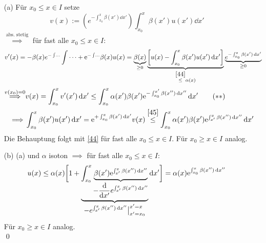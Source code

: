 \documentclass[a4paper]{article}
\begin{document}
\begin{Beweis}
\begin{itemize}
\item[(a)]Für $x_0\le x\in I$ setze
\[v(x):=\left(e^{-\int_{x_0}^x\beta(x')\dd x'}\right)\int_{x_0}^x\beta(x')u(x')\dd x'\]
$\overset{\text{abs. stetig}}{\implies}$ für fast alle $x_0\le x\in I$:
\[v'(x)=-\beta(x)e^{-\int\dots}\int\dots+\mathrm{e}^{-\int \dots}\beta(x)u(x)
=\underbrace{\beta(x)}_{\ge 0}\underbrace{\left[u(x)-\int_{x_0}^x\beta(x')u(x')\mathop{}\!\mathrm{d} x'\right]}_{\overset{\eqref{44}}{\le} \alpha(x)}\underbrace{e^{-\int_{x_0}^x\beta(x')\mathop{}\!\mathrm{d} x'}}_{\ge 0}\]
\begin{align*}
\overset{v(x_0)=0}\implies & v(x)=\int_{x_0}^x v'(x')\mathop{}\!\mathrm{d} x'\le\int_{x_0}^x\alpha(x')\beta(x')\mathrm{e}^{-\int_{x_0}^{x'}\beta(x'')\mathop{}\!\mathrm{d} x''}\mathop{}\!\mathrm{d} x' \tag{$**$} \label{45} \\
\implies& \int_{x_0}^x\beta(x')u(x')\mathop{}\!\mathrm{d} x'=\mathrm{e}^{+\int_{x_0}^x\beta(x')\mathop{}\!\mathrm{d} x'}v(x)\overset{\eqref{45}}{\le} \int_{x_0}^x\alpha(x')\beta(x')\mathrm{e}^{\int_{x'}^x\beta(x'')\mathop{}\!\mathrm{d} x''}\mathop{}\!\mathrm{d} x'
\end{align*}
Die Behauptung folgt mit \eqref{44} für fast alle $x_0\le x\in I$. Für $x_0\ge x\in I$ analog.
\item[(b)] (a) und $\alpha$ isoton $\implies$ für fast alle $x_0\le x\in I$:
\[u(x)\le \alpha(x)\bigg{[}1+
\underbrace{\int_{x_0}^x\underbrace{\beta(x')\mathrm{e}^{\int_{x'}^x\beta(x'')\mathop{}\!\mathrm{d} x''}}_{\displaystyle-\frac{\mathop{}\!\mathrm{d} }{\mathop{}\!\mathrm{d} x'}e^{\int_{x'}^x\beta(x'')\mathop{}\!\mathrm{d} x''}}
}_{{\displaystyle-e^{\int_{x'}^x\beta(x'')\mathop{}\!\mathrm{d} x''}\big{|}_{x'=x_0}^{x'=x}}}
\mathop{}\!\mathrm{d} x'\bigg{]}
=\alpha(x)\mathrm{e}^{\int_{x_0}^x\beta(x'')\mathop{}\!\mathrm{d} x''}
\]
Für $x_0\ge x\in I$ analog.\\\qed
\end{itemize}
\end{Beweis}
\end{document}
